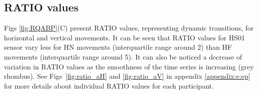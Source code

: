 %

\subsection*{RATIO values}
Figs \ref{fig:RQABP}(C) present RATIO values, representing dynamic transitions, 
for horizontal and vertical movements.
It can be seen that RATIO values for HS01 sensor vary less 
for HN movements (interquartile range around 2)
than HF movements (interquartile range around 5).
It can also be noticed a decrease of variation in RATIO values as the 
smoothness of the time series is increasing (grey rhombus).
See Figs~\ref{fig:ratio_aH} and \ref{fig:ratio_aV} in appendix 
\ref{appendix:e:ep} 
for more details about individual RATIO values for each participant.
%


